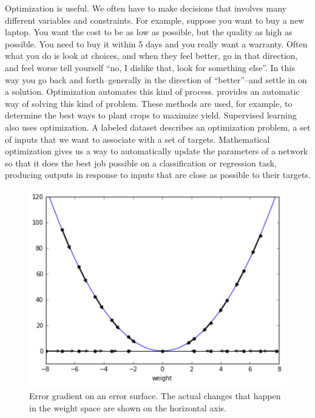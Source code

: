 Optimization is useful. We often have to make decisions that involves many different variables and constraints. For example, suppose you want to buy a new laptop. You want the cost to be as low as possible, but the quality as high as possible. You need to buy it within 5 days and you really want a warranty. Often what you do is look at choices,  and when they feel  better, go in that direction,  and feel worse  tell yourself  ``no, I dislike that, look for something else''. In this way you go back and forth--generally in the direction of ``better''--and settle in on a solution. Optimization automates this kind of process. provides an automatic way of solving this kind of problem. These methods are used, for example, to determine the best ways to plant  crops to maximize yield. Supervised learning also uses optimization. A labeled dataset describes an optimization problem, a set of inputs that we want to associate with a set of targets. Mathematical optimization gives us a way to automatically update the parameters of a network so that it does the best job possible on a classification or regression task, producing outputs in response to inputs that are close as possible to their targets.

\begin{figure}[h]
\centering
\includegraphics[scale=.5]{./images/GradientDescent.png}
\caption[Jeff Yoshimi.]{Error gradient on an error surface. The actual changes that happen in the weight space are shown on the horizontal axis.}
\label{gradient_descent}
\end{figure}

